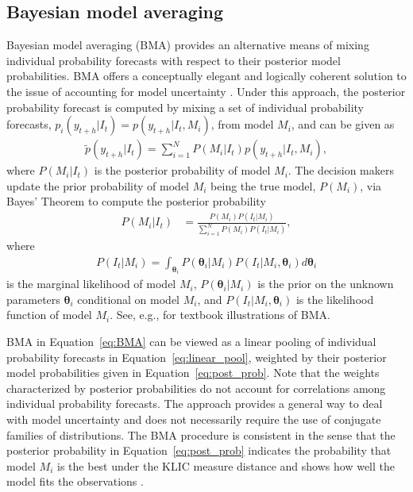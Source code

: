 \documentclass[11pt]{article}
\begin{document}
\subsection{Bayesian model averaging}
\label{sec:bma}

Bayesian model averaging (BMA) provides an alternative means of mixing individual probability forecasts with respect to their posterior model probabilities. BMA offers a conceptually elegant and logically coherent solution to the issue of accounting for model uncertainty \citep[see, e.g.,][]{Leamer1978-sp,Draper1995-cd,Raftery1997-ij,Garratt2003-kh}. Under this approach, the posterior probability forecast is computed by mixing a set of individual probability forecasts, $p_{i}(y_{t+h}|I_{t})=p(y_{t+h}|I_{t},M_{i})$, from model $M_{i}$, and can be given as
\begin{align}
\label{eq:BMA}
\tilde{p}(y_{t+h}|I_{t}) = \sum_{i=1}^{N} P(M_{i}|I_{t})p(y_{t+h}|I_{t},M_{i}),
\end{align}
where $P(M_{i}|I_{t})$ is the posterior probability of model $M_{i}$. The decision makers update the prior probability of model $M_{i}$ being the true model, $P(M_{i})$, via Bayes' Theorem to compute the posterior probability
\begin{align}
\label{eq:post_prob}
P(M_{i}|I_{t}) & = \frac{P(M_{i})P(I_{t}|M_{i})}{\sum_{i=1}^{N} P(M_{i})P(I_{t}|M_{i})},
\end{align}
where
\begin{align}
\label{eq:marginal_likelihood}
P(I_{t}|M_{i}) = \int_{\boldsymbol{\theta}_{i}} P\left(\boldsymbol{\theta}_{i} | M_{i}\right) P\left(I_{t} | M_{i}, \boldsymbol{\theta}_{i}\right) d \boldsymbol{\theta}_{i}
\end{align}
is the marginal likelihood of model $M_{i}$, $P\left(\boldsymbol{\theta}_{i} | M_{i}\right)$ is the prior on the unknown parameters $\boldsymbol{\theta}_{i}$ conditional on model $M_{i}$, and $P\left(I_{t} | M_{i}, \boldsymbol{\theta}_{i}\right)$ is the likelihood function of model $M_{i}$. See, e.g., \citet{Koop-2003bayesian} for textbook illustrations of BMA.

BMA in Equation~\eqref{eq:BMA} can be viewed as a linear pooling of individual probability forecasts in Equation~\eqref{eq:linear_pool}, weighted by their posterior model probabilities given in Equation~\eqref{eq:post_prob}. Note that the weights characterized by posterior probabilities do not account for correlations among individual probability forecasts. The approach provides a general way to deal with model uncertainty and does not necessarily require the use of conjugate families of distributions. The BMA procedure is consistent in the sense that the posterior probability in Equation~\eqref{eq:post_prob} indicates the probability that model $M_{i}$ is the best under the KLIC measure distance and shows how well the model fits the observations \citep{Fernandez-Villaverde2004-pz,Raftery2005-vu,Wright2008-bs}.
\end{document}
